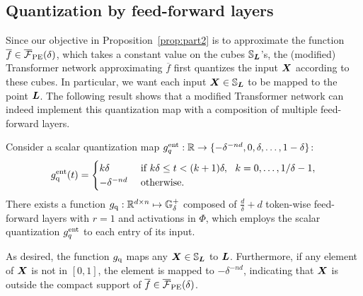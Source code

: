 \vspace*{-3pt}
\subsection{Quantization by feed-forward layers}
\vspace*{-3pt}
\label{sec:ff-quantize}
Since our objective in Proposition~\ref{prop:part2} is to approximate the function $\overline{f} \in \overline {\mathcal{F}}_{\rm PE}(\delta)$,
which takes a constant value on the cubes ${\mathbb{S}}_{{\bm{L}}}$'s, the (modified) Transformer network approximating $\overline{f}$ first quantizes the input ${\bm{X}}$ according to these cubes. In particular, we want each input ${\bm{X}} \in {\mathbb{S}}_{{\bm{L}}}$ to be mapped to the point ${\bm{L}}$. The following result shows that a modified Transformer network can indeed implement this quantization map with a composition of multiple feed-forward layers. 

\begin{lemma}
\label{lemma:quantize}
Consider a scalar quantization map $g^{\rm ent}_{q} : \mathbb{R} \to  \{ -\delta^{-nd}, 0, \delta, \dots, 1-\delta \}$:
\begin{equation*}
    g_{\rm q}^{\rm ent} (t) = 
    \begin{cases}
    k\delta & \text{ if } k\delta \leq t < (k+1)\delta, ~~k = 0, \dots, 1/\delta-1,\\
    -\delta^{-nd} & \text{ otherwise. }
    \end{cases}
\end{equation*}
There exists a function $g_{\rm q}: \mathbb{R}^{d \times n} \mapsto {\mathbb{G}}^{+}_{\delta}$ composed of $\frac{d}{\delta} + d$ token-wise feed-forward layers with $r=1$ and activations in $\Phi$, which employs the scalar quantization $g^{\rm ent}_{q}$ to each entry of its input.
\end{lemma}

As desired, the function $g_{\rm q}$ maps any ${\bm{X}} \in {\mathbb{S}}_{\bm{L}}$ to ${\bm{L}}$. Furthermore, if any element of ${\bm{X}}$ is not in $[0, 1]$, the element is mapped to $-\delta^{-nd}$, indicating that ${\bm{X}}$ is outside the compact support of $\overline{f} \in \overline{\mathcal{F}}_{\rm PE}(\delta)$.

\vspace*{-3pt}
